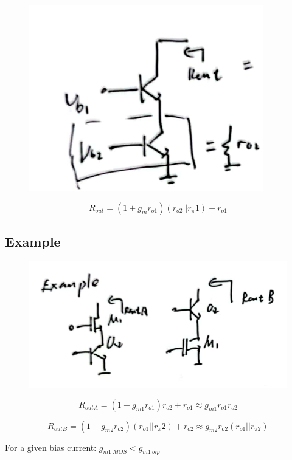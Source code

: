 \documentclass[fontset=windows]{article}
\begin{document}
\begin{figure}
    \centering
    \includegraphics[scale=0.7]{6.jpg}
    \captionsetup{labelformat=empty}
    \caption{}
    \label{6}
\end{figure}

$$R_{out}=(1+g_mr_{o1})(r_{o2}||r_\pi1)+r_{o1}$$

\subsection*{Example}

\begin{figure}[htbp]
    \centering
    \includegraphics[scale=0.7]{7.jpg}
    \captionsetup{labelformat=empty}
    \caption{}
    \label{7}
\end{figure}

$$R_{outA}=(1+g_{m1}r_{o1})r_{o2}+r_{o1}\approx g_{m1}r_{o1}r_{o2}$$

$$R_{outB}=(1+g_{m2}r_{o2})(r_{o1}||r_\pi2)+r_{o2}\approx g_{m2}r_{o2}(r_{o1}||r_{\pi2})$$

For a given bias current: $g_{m1\ MOS}<g_{m1\ bip}$
\end{document}
